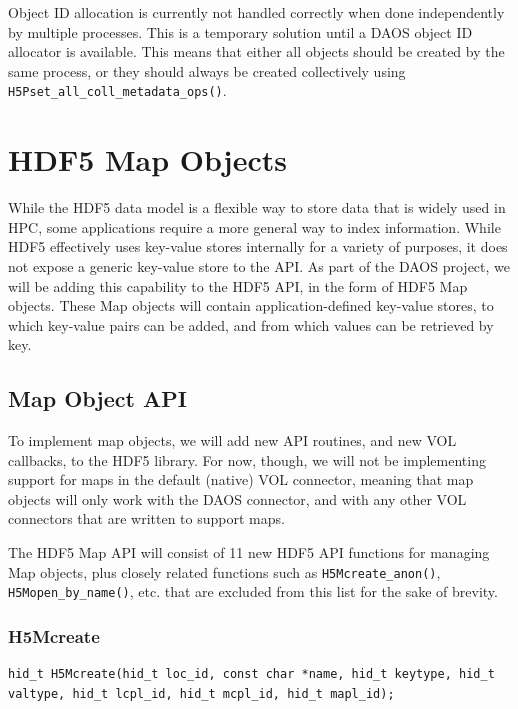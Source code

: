 Object ID allocation is currently not handled correctly when done independently by multiple processes. This is a temporary solution until a DAOS object ID allocator is available. This means that either all objects should be created by the same process, or they should always be created collectively using \verb+H5Pset_all_coll_metadata_ops()+.

\newpage

\section{HDF5 Map Objects}


While the HDF5 data model is a flexible way to store data that is widely used in HPC, some applications require a more general way to index information. While HDF5 effectively uses key-value stores internally for a variety of purposes, it does not expose a generic key-value store to the API. As part of the DAOS project, we will be adding this capability to the HDF5 API, in the form of HDF5 Map objects. These Map objects will contain application-defined key-value stores, to which key-value pairs can be added, and from which values can be retrieved by key.

\subsection{Map Object API}
To implement map objects, we will add new API routines, and new VOL callbacks, to the HDF5 library. For now, though, we will not be implementing support for maps in the default (native) VOL connector, meaning that map objects will only work with the DAOS connector, and with any other VOL connectors that are written to support maps.

The HDF5 Map API will consist of 11 new HDF5 API functions for managing Map objects, plus closely related functions such as \verb+H5Mcreate_anon()+, \verb+H5Mopen_by_name()+, etc. that are excluded from this list for the sake of brevity.

\subsubsection{H5Mcreate}

{
\begin{lstlisting}
hid_t H5Mcreate(hid_t loc_id, const char *name, hid_t keytype, hid_t valtype, hid_t lcpl_id, hid_t mcpl_id, hid_t mapl_id);
\end{lstlisting}
}

